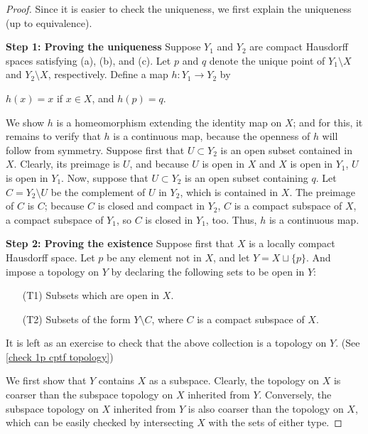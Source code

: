 \begin{proof}
    Since it is easier to check the uniqueness, we first explain the uniqueness (up to equivalence).

    \textbf{Step 1: Proving the uniqueness}\newline\noindent
    Suppose $Y_1$ and $Y_2$ are compact Hausdorff spaces satisfying (a), (b), and (c).
    Let $p$ and $q$ denote the unique point of $Y_1\setminus X$ and $Y_2\setminus X$, respectively.
    Define a map $h: Y_1\rightarrow Y_2$ by
    \begin{center}
        $h(x)=x$ if $x\in X$, and $h(p)=q$.
    \end{center}
    We show $h$ is a homeomorphism extending the identity map on $X$; and for this, it remains to verify that $h$ is a continuous map, because the openness of $h$ will follow from symmetry.
    Suppose first that $U\subset Y_2$ is an open subset contained in $X$.
    Clearly, its preimage is $U$, and because $U$ is open in $X$ and $X$ is open in $Y_1$, $U$ is open in $Y_1$.
    Now, suppose that $U\subset Y_2$ is an open subset containing $q$.
    Let $C=Y_2\setminus U$ be the complement of $U$ in $Y_2$, which is contained in $X$.
    The preimage of $C$ is $C$; because $C$ is closed and compact in $Y_2$, $C$ is a compact subspace of $X$, a compact subspace of $Y_1$, so $C$ is closed in $Y_1$, too.
    Thus, $h$ is a continuous map.

    \textbf{Step 2: Proving the existence}\newline\noindent
    Suppose first that $X$ is a locally compact Hausdorff space.
    Let $p$ be any element not in $X$, and let $Y=X\sqcup\{p\}$.
    And impose a topology on $Y$ by declaring the following sets to be open in $Y$:
    \begin{enumerate}
        \item[(T1)]
        {
            Subsets which are open in $X$.
        }
        \item[(T2)]
        {
            Subsets of the form $Y\setminus C$, where $C$ is a compact subspace of $X$.
        }
    \end{enumerate}
    It is left as an exercise to check that the above collection is a topology on $Y$. (See \cref{check 1p cptf topology})

    We first show that $Y$ contains $X$ as a subspace.
    Clearly, the topology on $X$ is coarser than the subspace topology on $X$ inherited from $Y$.
    Conversely, the subspace topology on $X$ inherited from $Y$ is also coarser than the topology on $X$, which can be easily checked by intersecting $X$ with the sets of either type.


\end{proof}
